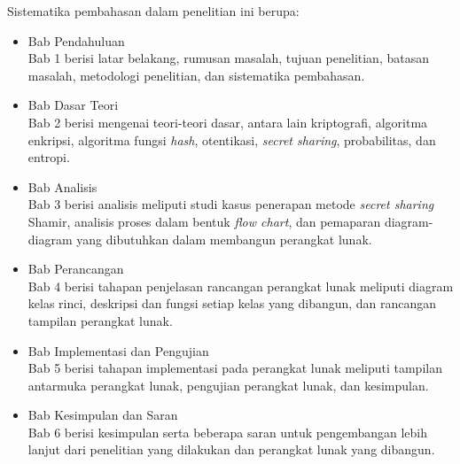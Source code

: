 Sistematika pembahasan dalam penelitian ini berupa:
\begin{itemize}
	\item Bab Pendahuluan
	\\Bab 1 berisi latar belakang, rumusan masalah, tujuan penelitian, batasan masalah, metodologi penelitian, dan sistematika pembahasan.
	\item Bab Dasar Teori
	\\Bab 2 berisi mengenai teori-teori dasar, antara lain kriptografi, algoritma enkripsi, algoritma fungsi \textit{hash}, otentikasi, \textit{secret sharing}, probabilitas, dan entropi.
	\item Bab Analisis
	\\Bab 3 berisi analisis meliputi studi kasus penerapan metode \textit{secret sharing} Shamir, analisis proses dalam bentuk \textit{flow chart}, dan pemaparan diagram-diagram yang dibutuhkan dalam membangun perangkat lunak.
	\item Bab Perancangan
	\\Bab 4 berisi tahapan penjelasan rancangan perangkat lunak meliputi diagram kelas rinci, deskripsi dan fungsi setiap kelas yang dibangun, dan rancangan tampilan perangkat lunak.
	\item Bab Implementasi dan Pengujian
	\\Bab 5 berisi tahapan implementasi pada perangkat lunak meliputi tampilan antarmuka perangkat lunak, pengujian perangkat lunak, dan kesimpulan.
	\item Bab Kesimpulan dan Saran
	\\Bab 6 berisi kesimpulan serta beberapa saran untuk pengembangan lebih lanjut dari penelitian yang dilakukan dan perangkat lunak yang dibangun.
\end{itemize}